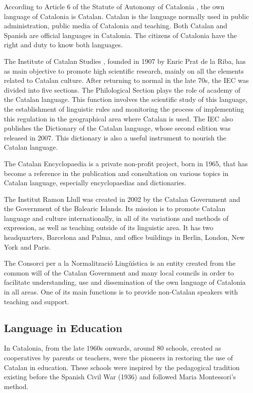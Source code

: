 \documentclass[]{../../metanetpaper}
\begin{document}
\begin{multicols}{2}
According to Article 6 of the Statute of Autonomy of Catalonia \cite{CAT-estatut}, the own language of Catalonia is Catalan. Catalan is the language normally used in public administration, public media of Catalonia and teaching. Both Catalan and Spanish are official languages in Catalonia. The citizens of Catalonia have the right and duty to know both languages.

The Institute of Catalan Studies \cite{CAT-IEC}, founded in 1907 by Enric Prat de la Riba, has as main objective to promote high scientific research, mainly on all the elements related to Catalan culture. After returning to normal in the late 70s, the IEC was divided into five sections. The Philological Section plays the role of academy of the Catalan language. This function involves the scientific study of this language, the establishment of linguistic rules and monitoring the process of implementing this regulation in the geographical area where Catalan is used. The IEC also publishes the Dictionary of the Catalan language, whose second edition was released in 2007. This dictionary is also a useful instrument to nourish the Catalan language.

The Catalan Encyclopaedia \cite{CAT-enciclopedia} is a private non-profit project, born in 1965, that has become a reference in the publication and consultation on various topics in Catalan language, especially encyclopaedias and dictionaries.

The Institut Ramon Llull \cite{CAT-llull} was created in 2002 by the Catalan Government and the Government of the Balearic Islands. Its mission is to promote Catalan language and culture internationally, in all of its variations and methods of expression, as well as teaching outside of its linguistic area. It has two headquarters, Barcelona and Palma, and office buildings in Berlin, London, New York and Paris.

The Consorci per a la Normalització Lingüística \cite{CAT-cpnl} is an entity created from the common will of the Catalan Government and many local councils in order to facilitate understanding, use and dissemination of the own language of Catalonia in all areas. One of its main functions is to provide non-Catalan speakers with teaching and support.

\subsection{Language in Education}

In Catalonia, from the late 1960s onwards, around 80 schools, created as cooperatives by parents or teachers, were the pioneers in restoring the use of Catalan in education. These schools were inspired by the pedagogical tradition existing before the Spanish Civil War (1936) and followed Maria Montessori's method.


\end{multicols}
\end{document}
